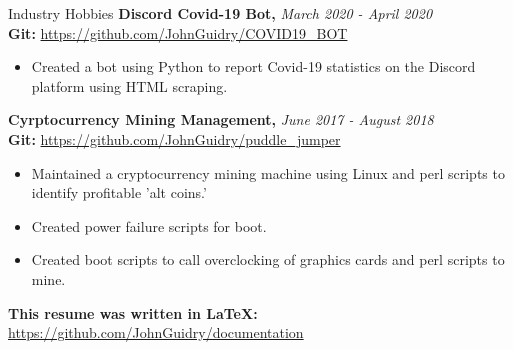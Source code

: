 \documentclass{resume} %
\begin{document}

\begin{rSection}{Industry Hobbies} 
{\bf Discord Covid-19 Bot, }{\em March 2020 - April 2020} 
\\
{\bf Git: }\url {https://github.com/JohnGuidry/COVID19_BOT}
\begin{itemize}
\item Created a bot using Python to report Covid-19 statistics on the Discord platform using HTML scraping.
\end{itemize}

{\bf Cyrptocurrency Mining Management, }{\em June 2017 - August 2018} 
\\
{\bf Git: }\url {https://github.com/JohnGuidry/puddle_jumper}
\begin{itemize}
\item Maintained a cryptocurrency mining machine using Linux and perl scripts to identify profitable 'alt coins.'
\item Created power failure scripts for boot.
\item Created boot scripts to call overclocking of graphics cards and perl scripts to mine.
\end{itemize}

{\bf This resume was written in LaTeX: }\url{https://github.com/JohnGuidry/documentation}
\end{rSection}
\end{document}
